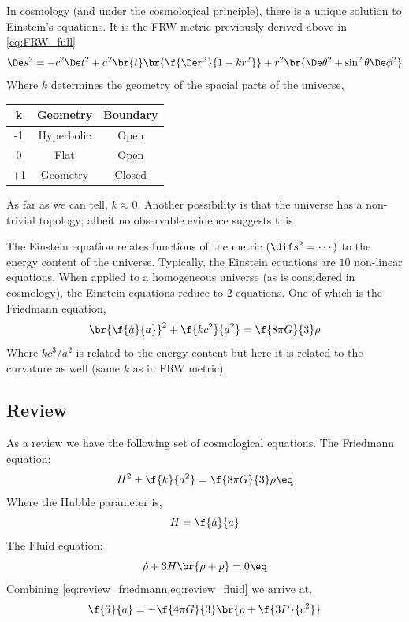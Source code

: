 \documentclass{article}
\begin{document}
In cosmology (and under the cosmological principle), there is a unique solution to Einstein's equations. It is the FRW metric previously derived above in \cref{eq:FRW_full}
\[ \De s^2 = - c^2 \De t^2 + a^2\br{t}\br{\f{\De r^2}{1 - kr^2}} + r^2 \br{\De \theta^2 + \sin^2 \theta \De \phi^2} \]
Where $k$ determines the geometry of the spacial parts of the universe,

\begin{center}
\begin{tabular}{|c|c|c|}
    \hline
    k & Geometry & Boundary \\
    \hline
    -1 & Hyperbolic & Open \\
    0  & Flat & Open \\
    +1 & Geometry & Closed \\
    \hline
\end{tabular}
\end{center}

As far as we can tell, $k\approx 0$. Another possibility is that the universe has a non-trivial topology; albeit no observable evidence suggests this.

The Einstein equation relates functions of the metric $(\dif s^2 = \cdots)$ to the energy content of the universe. Typically, the Einstein equations are $10$ non-linear equations. When applied to a homogeneous universe (as is considered in cosmology), the Einstein equations reduce to $2$ equations. One of which is the Friedmann equation,
\[ \br{\f{\dot a}{a}}^2 + \f{k c^2}{a^2} = \f{8 \pi G}{3} \rho \]
Where $kc^3/a^2$ is related to the energy content but here it is related to the curvature as well (same $k$ as in FRW metric).

\subsection{Review}
As a review we have the following set of cosmological equations.
The Friedmann equation:
\[ H^2 + \f{k}{a^2} = \f{8\pi G}{3} \rho \eq \label{eq:review_friedmann}\]
Where the Hubble parameter is,
\[ H = \f{\dot a}{a} \]
The Fluid equation:
\[ \dot \rho + 3 H \br{\rho + p} = 0 \eq \label{eq:review_fluid} \]
Combining \cref{eq:review_friedmann,eq:review_fluid} we arrive at,
\[ \f{\ddot a}{a} = - \f{4 \pi G}{3}\br{\rho + \f{3P}{c^2}} \]
\end{document}
